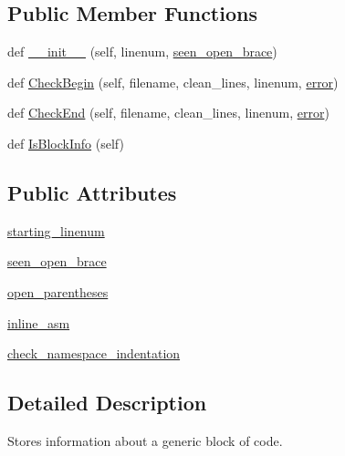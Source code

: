 \subsection*{Public Member Functions}
\begin{DoxyCompactItemize}
\item 
def \hyperlink{classcpplint_1_1___block_info_ab1663260e978a348a4ff2ab9d7324587}{\+\_\+\+\_\+init\+\_\+\+\_\+} (self, linenum, \hyperlink{classcpplint_1_1___block_info_aa974539217437751383ad20896c974d7}{seen\+\_\+open\+\_\+brace})
\item 
def \hyperlink{classcpplint_1_1___block_info_af316a9e3623b45bd07079166be67582c}{Check\+Begin} (self, filename, clean\+\_\+lines, linenum, \hyperlink{_07copy_08_2_read_camera_model_8m_ac546fdc9911f4a876dbfaffbc7426f8b}{error})
\item 
def \hyperlink{classcpplint_1_1___block_info_ae504a3429de136eebf85f32fcae6a8ca}{Check\+End} (self, filename, clean\+\_\+lines, linenum, \hyperlink{_07copy_08_2_read_camera_model_8m_ac546fdc9911f4a876dbfaffbc7426f8b}{error})
\item 
def \hyperlink{classcpplint_1_1___block_info_ab3e06a94a38d7397ce6a4faa094010d4}{Is\+Block\+Info} (self)
\end{DoxyCompactItemize}
\subsection*{Public Attributes}
\begin{DoxyCompactItemize}
\item 
\hyperlink{classcpplint_1_1___block_info_a81d316f03e42aebbfe0636f905c4c291}{starting\+\_\+linenum}
\item 
\hyperlink{classcpplint_1_1___block_info_aa974539217437751383ad20896c974d7}{seen\+\_\+open\+\_\+brace}
\item 
\hyperlink{classcpplint_1_1___block_info_a02a0b48995a599f6b2bbaa6f16cca98a}{open\+\_\+parentheses}
\item 
\hyperlink{classcpplint_1_1___block_info_aad762ef7088f2f556a75c9a80006f4db}{inline\+\_\+asm}
\item 
\hyperlink{classcpplint_1_1___block_info_a120822b07db37b3480a573ec29ee4457}{check\+\_\+namespace\+\_\+indentation}
\end{DoxyCompactItemize}


\subsection{Detailed Description}
\begin{DoxyVerb}Stores information about a generic block of code.\end{DoxyVerb}
 

